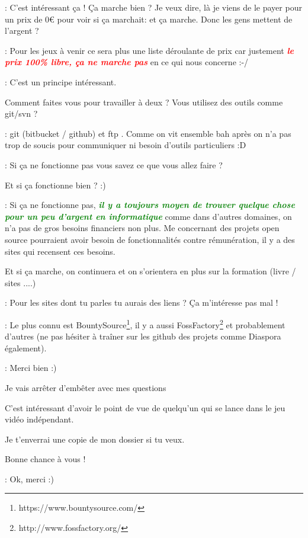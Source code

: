 \documentclass[a4paper,12pt, draft]{report}
\newcommand{\goodPoint}[1]{\textcolor{green}{\textbf{\textit{#1}}}}
\newcommand{\badPoint}[1]{\textcolor{red}{\textbf{\textit{#1}}}}
\begin{document}
\begin{description}
\item 
\item [Question]: C'est intéressant ça ! Ça marche bien ? Je veux dire, là je viens de le payer pour un prix de 0€ pour voir si ça marchait: et ça marche. Donc les gens mettent de l'argent ?
\item 
\item [Réponse]: Pour les jeux à venir ce sera plus une liste déroulante de prix car justement \badPoint{le prix 100\% libre, ça ne marche pas} en ce qui nous concerne :-/
\item 
\item [Question]: C'est un principe intéressant.
\item Comment faites vous pour travailler à deux ? Vous utilisez des outils comme git/svn ?
\item 
\item [Réponse]: git (bitbucket / github) et ftp  . Comme on vit ensemble bah après on n'a pas trop de soucis pour communiquer ni besoin d'outils particuliers :D
\item 
\item [Question]: Si ça ne fonctionne pas vous savez ce que vous allez faire ?
\item Et si ça fonctionne bien ? :)
\item 
\item [Réponse]: Si ça ne fonctionne pas, \goodPoint{il y a toujours moyen de trouver quelque chose pour un peu d'argent en informatique} comme dans d'autres domaines, on n'a pas de gros besoins financiers non plus. Me concernant des projets open source pourraient avoir besoin de fonctionnalités contre rémunération, il y a des sites qui recensent ces besoins.
\item Et si ça marche, on continuera et on s'orientera en plus sur la formation (livre / sites ....)
\item 
\item [Question]: Pour les sites dont tu parles tu aurais des liens ? Ça m'intéresse pas mal !
\item 
\item [Réponse]: Le plus connu est BountySource\footnote{https://www.bountysource.com/}, il y a aussi FossFactory\footnote{http://www.fossfactory.org/} et probablement d'autres (ne pas hésiter à traîner sur les github des projets comme Diaspora également).
\item 
\item [Question]: Merci bien :)
\item Je vais arrêter d'embêter avec mes questions  
\item C'est intéressant d'avoir le point de vue de quelqu'un qui se lance dans le jeu vidéo indépendant.
\item Je t'enverrai une copie de mon dossier si tu veux.
\item Bonne chance à vous !
\item 
\item [Réponse]: Ok, merci :)

\end{description}
\end{document}

